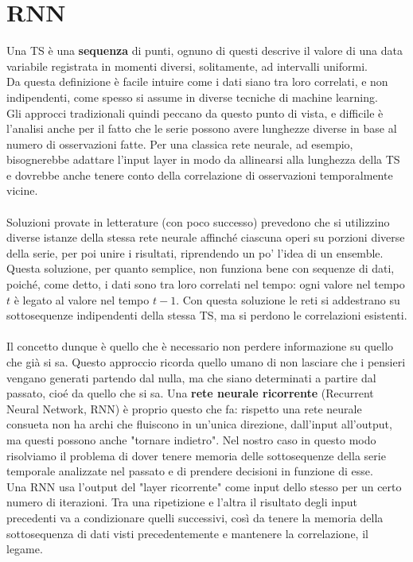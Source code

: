 \section{RNN}
Una TS è una \textbf{sequenza} di punti, ognuno di questi descrive il valore di una data variabile registrata in momenti diversi, solitamente, ad intervalli uniformi.\\
Da questa definizione è facile intuire come i dati siano tra loro correlati, e non indipendenti, come spesso si assume in diverse tecniche di machine learning.\\
Gli approcci tradizionali quindi peccano da questo punto di vista, e difficile è l'analisi anche per il fatto che le serie possono avere lunghezze diverse in base al numero di osservazioni fatte. Per una classica rete neurale, ad esempio, bisognerebbe adattare l'input layer in modo da allinearsi alla lunghezza della TS e dovrebbe anche tenere conto della correlazione di osservazioni temporalmente vicine.\\
\\
Soluzioni provate in letterature (con poco successo) prevedono che si utilizzino  diverse istanze della stessa rete neurale affinché ciascuna operi su porzioni diverse della serie, per poi unire i risultati, riprendendo un po' l'idea di un ensemble. \\
Questa soluzione, per quanto semplice, non funziona bene con sequenze di dati, poiché, come detto, i dati sono tra loro correlati nel tempo: ogni valore nel tempo $t$ è legato al valore nel tempo $t-1$. Con questa soluzione le reti si addestrano su sottosequenze indipendenti della stessa TS, ma si perdono le correlazioni esistenti.\\
\\
Il concetto dunque è quello che è necessario non perdere informazione su quello che già si  sa. Questo approccio ricorda quello umano di non lasciare che i pensieri vengano generati partendo dal nulla, ma che siano determinati a partire dal passato, cioé da quello che si sa. Una \textbf{rete neurale ricorrente} (Recurrent Neural Network, RNN) è proprio questo che fa: rispetto una rete neurale consueta non ha archi che fluiscono in un'unica direzione, dall'input all'output, ma questi possono anche "tornare indietro".
Nel nostro caso in questo modo risolviamo il problema di dover tenere memoria delle sottosequenze della serie temporale analizzate nel passato e di prendere decisioni in funzione di esse.\\
Una RNN usa l'output del "layer ricorrente" come input dello stesso per un certo numero di iterazioni. Tra una ripetizione e l'altra il risultato degli input precedenti va a condizionare quelli successivi, così da tenere la memoria della sottosequenza di dati visti precedentemente e mantenere la correlazione, il legame.\\
